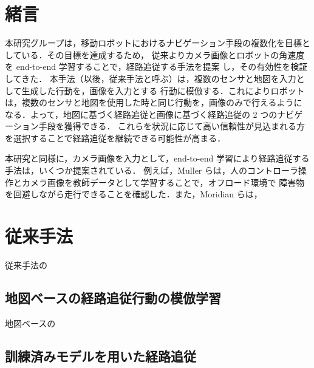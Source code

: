 \documentclass{jarticle}
\begin{document}
\date{} %

\maketitle
\thispagestyle{empty}
\pagestyle{empty}

\small
\section{緒言\protect\\}
本研究グループは，移動ロボットにおけるナビゲーション手段の複数化を目標としている．その目標を達成するため，
従来よりカメラ画像とロボットの角速度を end-to-end 学習することで，経路追従する手法を提案
し，その有効性を検証してきた\cite{okada}\cite{okada2}\cite{kiyooka}．
本手法（以後，従来手法と呼ぶ）は，複数のセンサと地図を入力として生成した行動を，画像を入力とする
行動に模倣する．これによりロボットは，複数のセンサと地図を使用した時と同じ行動を，画像のみで行えるように
なる．よって，地図に基づく経路追従と画像に基づく経路追従の 2 つのナビゲーション手段を獲得できる．
これらを状況に応じて高い信頼性が見込まれる方を選択することで経路追従を継続できる可能性が高まる．

本研究と同様に，カメラ画像を入力として，end-to-end 学習により経路追従する手法は，いくつか提案されている．
例えば，Muller らは，人のコントローラ操作とカメラ画像を教師データとして学習することで，オフロード環境で
障害物を回避しながら走行できることを確認した\cite{off_load}．また，Moridian らは，


\section{従来手法\protect\\}
従来手法の\\

\subsection{地図ベースの経路追従行動の模倣学習}
地図ベースの\\

\subsection{訓練済みモデルを用いた経路追従}
\end{document}
